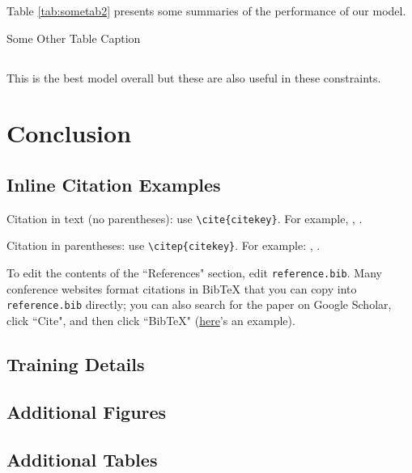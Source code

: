 \documentclass[12pt,letterpaper]{article}
\begin{document}
Table \ref{tab:sometab2} presents some summaries of the performance of our model.

\begin{table}[htbp]
\caption{Some Other Table Caption}
\label{tab:sometab2}
\resizebox{0.9\linewidth}{!}{}
\end{table}

\subsection{}
This is the best model overall
but these are also useful in these constraints.

\section{Conclusion}

\subsection{Inline Citation Examples}

Citation in text (no parentheses): use \texttt{{\textbackslash}cite\{citekey\}}. 
For example, \cite{breiman2011}, \cite{devlin2019bert}.

Citation in parentheses: use \texttt{{\textbackslash}citep\{citekey\}}. 
For example: \citep{vaswani2023attention}, \citep{karras2019stylebased}.



\makereference

{\color{blue} To edit the contents of the ``References" section, edit \texttt{reference.bib}. Many conference websites format citations in BibTeX that you can copy into \texttt{reference.bib} directly; you can also search for the paper on Google Scholar, click ``Cite", and then click ``BibTeX" (\href{https://scholar.google.com/scholar?hl=en&as_sdt=0%2C23&q=attention+is+all+you+need&btnG=#d=gs_cit&t=1700436667623&u=%2Fscholar%3Fq%3Dinfo%3A5Gohgn6QFikJ%3Ascholar.google.com%2F%26output%3Dcite%26scirp%3D0%26hl%3Den}{here}'s an example).}





\clearpage
\makeappendix

\subsection{Training Details}

\subsection{Additional Figures}

\subsection{Additional Tables}
\end{document}
